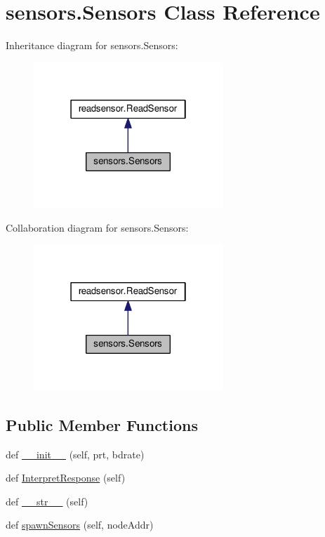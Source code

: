 \hypertarget{classsensors_1_1Sensors}{}\section{sensors.\+Sensors Class Reference}
\label{classsensors_1_1Sensors}


Inheritance diagram for sensors.\+Sensors\+:\nopagebreak
\begin{figure}[H]
\begin{center}
\leavevmode
\includegraphics[width=202pt]{classsensors_1_1Sensors__inherit__graph}
\end{center}
\end{figure}


Collaboration diagram for sensors.\+Sensors\+:\nopagebreak
\begin{figure}[H]
\begin{center}
\leavevmode
\includegraphics[width=202pt]{classsensors_1_1Sensors__coll__graph}
\end{center}
\end{figure}
\subsection*{Public Member Functions}
\begin{DoxyCompactItemize}
\item 
def \hyperlink{classsensors_1_1Sensors_a6f66687dc0058806d12630e3459a4b39}{\+\_\+\+\_\+init\+\_\+\+\_\+} (self, prt, bdrate)
\item 
def \hyperlink{classsensors_1_1Sensors_ae27acc61935425a396ba555e00b9035d}{Interpret\+Response} (self)
\item 
def \hyperlink{classsensors_1_1Sensors_a31172fc78a9e842c470acb6719363e5c}{\+\_\+\+\_\+str\+\_\+\+\_\+} (self)
\item 
def \hyperlink{classsensors_1_1Sensors_a99031e3e3ce8a181ee662daef4857cc3}{spawn\+Sensors} (self, node\+Addr)
\end{DoxyCompactItemize}

